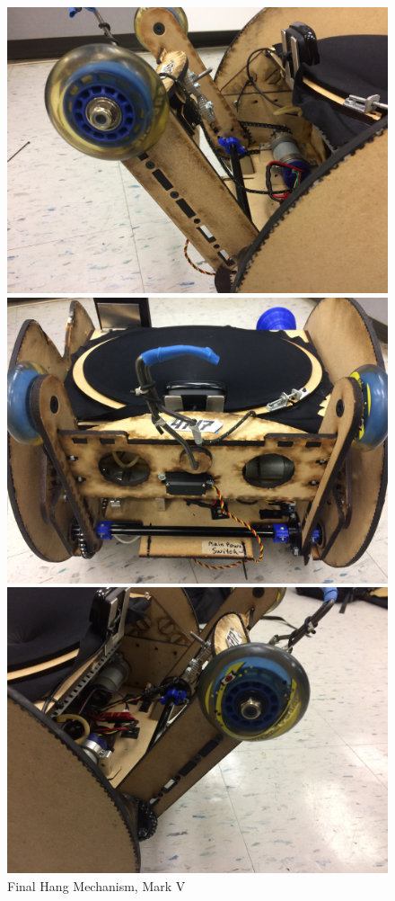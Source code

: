 \begin{figure}[htp]
\centering
\begin{minipage}{.32\textwidth}
  \centering
  \includegraphics[width= .9\linewidth]{Design_Overview/Hang_Left.JPG}
\end{minipage}%
\hfill
\begin{minipage}{.32\textwidth}
  \centering
  \includegraphics[width= .9\linewidth]{Design_Overview/Hang_Front.JPG}
	\caption{Final Hang Mechanism, Mark V}
	\label{fig:hang_final_IMG}
\end{minipage}%
	\hfill
\begin{minipage}{.32\textwidth}
  \centering
  \includegraphics[width= .9\linewidth]{Design_Overview/Hang_Right.JPG}

\end{minipage}
\end{figure}
